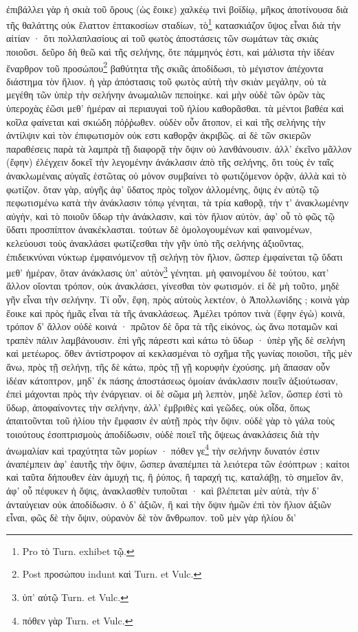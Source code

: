 \documentclass[a4paper, 11pt, oneside, polutonikogreek, german]{article}
\begin{document}
\paragraph{}
ἐπιβάλλει γὰρ ἡ σκιὰ τοῦ ὄρους (ὡς ἔοικε) χαλκέῳ τινὶ βοϊδίῳ, μῆκος ἀποτίνουσα διὰ τῆς θαλάττης οὐκ ἔλαττον ἑπτακοσίων σταδίων, τὸ\footnote{Pro τὸ Turn. exhibet τῷ.} κατασκιάζον ὕψος εἶναι διὰ τὴν αἰτίαν · ὅτι πολλαπλασίους αἱ τοῦ φωτὸς ἀποστάσεις τῶν σωμάτων τὰς σκιὰς ποιοῦσι. δεῦρο δὴ θεῶ καὶ τῆς σελήνης, ὅτε πάμμηνός ἐστι, καὶ μάλιστα τὴν ἰδέαν ἔναρθρον τοῦ προσώπου\footnote{Post προσώπου indunt καὶ Turn. et Vulc.} βαθύτητα τῆς σκιᾶς ἀποδίδωσι, τὸ μέγιστον ἀπέχοντα διάστημα τὸν ἥλιον. ἡ γὰρ ἀπόστασις τοῦ φωτὸς αὐτὴ τὴν σκιὰν μεγάλην, οὐ τὰ μεγέθη τῶν ὑπὲρ τὴν σελήνην ἀνωμαλιῶν πεποίηκε. καὶ μὴν οὐδὲ τῶν ὀρῶν τὰς ὑπεροχὰς ἐῶσι μεθ' ἡμέραν αἱ περιαυγαὶ τοῦ ἡλίου καθορᾶσθαι. τὰ μέντοι βαθέα καὶ κοῖλα φαίνεται καὶ σκιώδη πόῤῥωθεν. οὐδὲν οὖν ἄτοπον, εἰ καὶ τῆς σελήνης τὴν ἀντίλψιν καὶ τὸν ἐπιφωτισμὸν οὐκ εστι καθορᾷν ἀκριβῶς. αἱ δὲ τῶν σκιερῶν παραθέσεις παρὰ τὰ λαμπρὰ τῇ διαφορᾷ τὴν ὄψιν οὐ λανθάνουσιν. ἀλλ' ἐκεῖνο μᾶλλον (ἔφην) ἐλέγχειν δοκεῖ τὴν λεγομένην ἀνάκλασιν ἀπὸ τῆς σελήνης, ὅτι τοὺς ἐν ταῖς ἀνακλωμέναις αὐγαῖς ἑστῶτας οὐ μόνον συμβαίνει τὸ φωτιζόμενον ὁρᾷν, ἀλλὰ καὶ τὸ φωτίζον. ὅταν γὰρ, αὐγῆς ἀφ' ὕδατος πρὸς τοῖχον ἀλλομένης, ὄψις ἐν αὐτῷ τῷ πεφωτισμένω κατὰ τὴν ἀνάκλασιν τόπῳ γένηται, τὰ τρία καθορᾷ, τήν τ' ἀνακλωμένην αὐγὴν, καὶ τὸ ποιοῦν ὕδωρ τὴν ἀνάκλασιν, καὶ τὸν ἥλιον αὐτὸν, ἀφ' οὗ τὸ φῶς τῷ ὕδατι προσπίπτον ἀνακέκλασται. τούτων δὲ ὁμολογουμένων καὶ φαινομένων, κελεύουσι τοὺς ἀνακλάσει φωτίζεσθαι τὴν γῆν ὑπὸ τῆς σελήνης ἀξιοῦντας, ἐπιδεικνύναι νύκτωρ ἐμφαινόμενον τῇ σελήνῃ τὸν ἥλιον, ὥσπερ ἐμφαίνεται τῷ ὕδατι μεθ' ἡμέραν, ὅταν ἀνάκλασις ὑπ' αὐτὸν\footnote{ὑπ' αὐτῷ Turn. et Vulc.} γένηται. μὴ φαινομένου δὲ τούτου, κατ' ἄλλον οἴονται τρόπον, οὐκ ἀνακλάσει, γίνεσθαι τὸν φωτισμόν. εἰ δὲ μὴ τοῦτο, μηδὲ γῆν εἶναι τὴν σελήνην. Τί οὖν, ἔφη, πρὸς αὐτοὺς λεκτέον, ὁ Ἀπολλωνίδης ; κοινὰ γὰρ ἔοικε καὶ πρὸς ἡμᾶς εἶναι τὰ τῆς ἀνακλάσεως. Ἀμέλει τρόπον τινὰ (ἔφην ἐγὼ) κοινὰ, τρόπον δ' ἄλλον οὐδὲ κοινά · πρῶτον δὲ ὅρα τὰ τῆς εἰκόνος, ὡς ἄνω ποταμῶν καὶ τραπὲν πάλιν λαμβάνουσιν. ἐπὶ γῆς πάρεστι καὶ κάτω τὸ ὕδωρ · ὑπὲρ γῆς δὲ σελήνη καὶ μετέωρος. ὅθεν ἀντίστροφον αἱ κεκλασμέναι τὸ σχῆμα τῆς γωνίας ποιοῦσι, τῆς μὲν ἄνω, πρὸς τῇ σελήνῃ, τῆς δὲ κάτω, πρὸς τῇ γῇ κορυφὴν ἐχούσης. μὴ ἅπασαν οὖν ἰδέαν κάτοπτρον, μηδ' ἐκ πάσης ἀποστάσεως ὁμοίαν ἀνάκλασιν ποιεῖν ἀξιούτωσαν, ἐπεὶ μάχονται πρὸς τὴν ἐνάργειαν. οἱ δὲ σῶμα μὴ λεπτὸν, μηδὲ λεῖον, ὥσπερ ἐστὶ τὸ ὕδωρ, ἀποφαίνοντες τὴν σελήνην, ἀλλ' ἐμβριθὲς καὶ γεῶδες, οὐκ οἶδα, ὅπως ἀπαιτοῦνται τοῦ ἡλίου τὴν ἔμφασιν ἐν αὐτῇ πρὸς τὴν ὄψιν. οὐδὲ γὰρ τὸ γάλα τοὺς τοιούτους ἐσοπτρισμοὺς ἀποδίδωσιν, οὐδὲ ποιεῖ τῆς ὄψεως ἀνακλάσεις διὰ τὴν ἀνωμαλίαν καὶ τραχύτητα τῶν μορίων · πόθεν γε\footnote{πόθεν γὰρ Turn. et Vulc.} τὴν σελήνην δυνατόν ἐστιν ἀναπέμπειν ἀφ' ἑαυτῆς τὴν ὄψιν, ὥσπερ ἀναπέμπει τὰ λειότερα τῶν ἐσόπτρων ; καίτοι καὶ ταῦτα δήπουθεν ἐὰν ἀμυχή τις, ἢ ῥύπος, ἢ ταραχή τις, καταλάβῃ, τὸ σημεῖον ἂν, ἀφ' οὗ πέφυκεν ἡ ὄψις, ἀνακλασθὲν τυποῦται · καὶ βλέπεται μὲν αὐτὰ, τὴν δ' ἀνταύγειαν οὐκ ἀποδίδωσιν. ὁ δ' ἀξιῶν, ἢ καὶ τὴν ὄψιν ἡμῶν ἐπὶ τὸν ἥλιον ἀξιῶν εἶναι, φῶς δὲ τὴν ὄψιν, οὐρανὸν δὲ τὸν ἄνθρωπον. τοῦ μὲν γὰρ ἡλίου δι' 
\end{document}
